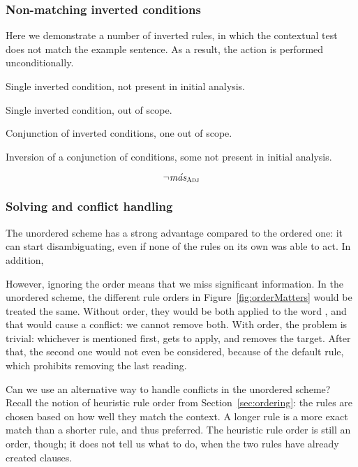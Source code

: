 \subsubsection{Non-matching inverted conditions}

Here we demonstrate a number of inverted rules, in which the contextual test does not match the example sentence. As a result, the action is performed unconditionally.

 Single inverted condition, not present in initial analysis.

 Single inverted condition, out of scope.

 Conjunction of inverted conditions, one out of scope.

 Inversion of a conjunction of conditions, some not present in initial analysis.

\begin{equation}
 \neg{}\text{\em m\'{a}s}_{\text{\sc Adj}} 
\end{equation}


\subsubsection{Solving and conflict handling}


The unordered scheme has a strong advantage compared to the ordered one: it can start disambiguating, even if none of the rules on its own was able to act. In addition, 

However, ignoring the order means that we miss significant information. In the unordered scheme, the different rule orders in Figure~\ref{fig:orderMatters} would be treated the same. 
Without order, they would be both applied to the word \mas, and that would cause a conflict: we cannot remove both.
With order, the problem is trivial: whichever is mentioned first, gets to apply, and removes the target. After that, the second one would not even be considered, because of the default rule, which prohibits removing the last reading.

Can we use an alternative way to handle conflicts in the unordered scheme?
Recall the notion of heuristic rule order from Section~\ref{sec:ordering}: the rules are chosen based on how well they match the context. A longer rule is a more exact match than a shorter rule, and thus preferred. The heuristic rule order is still an order, though; it does not tell us what to do, when the two rules have already created clauses.

